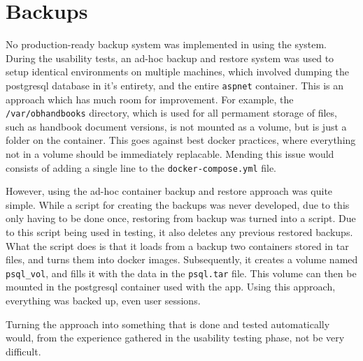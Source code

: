 \section{Backups}
No production-ready backup system was implemented in using the system.
During the usability tests, an ad-hoc backup and restore system was used to setup identical environments on multiple machines, which involved dumping the postgresql database in it's entirety, and the entire \texttt{aspnet} container.
This is an approach which has much room for improvement.
For example, the \texttt{/var/obhandbooks} directory, which is used for all permament storage of files, such as handbook document versions, is not mounted as a volume, but is just a folder on the container.
This goes against best docker practices, where everything not in a volume should be immediately replacable.
Mending this issue would consists of adding a single line to the \texttt{docker-compose.yml} file.

However, using the ad-hoc container backup and restore approach was quite simple.
While a script for creating the backups was never developed, due to this only having to be done once, restoring from backup was turned into a script.
Due to this script being used in testing, it also deletes any previous restored backups.
%
What the script does is that it loads from a backup two containers stored in tar files, and turns them into docker images.
Subsequently, it creates a volume named \texttt{psql_vol}, and fills it with the data in the \texttt{psql.tar} file.
This volume can then be mounted in the postgresql container used with the app.
Using this approach, everything was backed up, even user sessions.

Turning the approach into something that is done and tested automatically would, from the experience gathered in the usability testing phase, not be very difficult.
